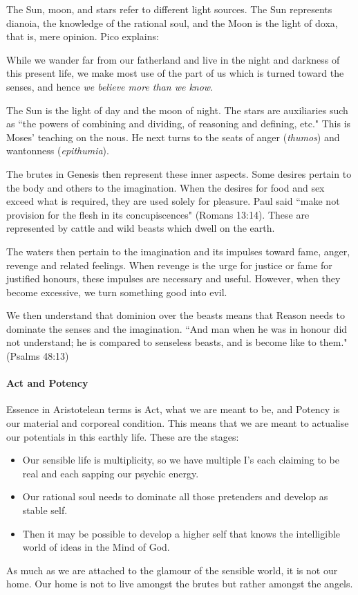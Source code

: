The Sun, moon, and stars refer to different light sources. The Sun represents dianoia, the knowledge of the rational soul, and the Moon is the light of doxa, that is, mere opinion. Pico explains:

\begin{quotex}
While we wander far from our fatherland and live in the night and darkness of this present life, we make most use of the part of us which is turned toward the senses, and hence \emph{we believe more than we know}. 

\end{quotex}
The Sun is the light of day and the moon of night. The stars are auxiliaries such as ``the powers of combining and dividing, of reasoning and defining, etc." This is Moses' teaching on the nous. He next turns to the seats of anger (\emph{thumos}) and wantonness (\emph{epithumia}).

The brutes in Genesis then represent these inner aspects. Some desires pertain to the body and others to the imagination. When the desires for food and sex exceed what is required, they are used solely for pleasure. Paul said ``make not provision for the flesh in its concupiscences" (Romans 13:14). These are represented by cattle and wild beasts which dwell on the earth.

The waters then pertain to the imagination and its impulses toward fame, anger, revenge and related feelings. When revenge is the urge for justice or fame for justified honours, these impulses are necessary and useful. However, when they become excessive, we turn something good into evil.

We then understand that dominion over the beasts means that Reason needs to dominate the senses and the imagination. ``And man when he was in honour did not understand; he is compared to senseless beasts, and is become like to them." (Psalms 48:13)

\paragraph{Act and Potency}
Essence in Aristotelean terms is Act, what we are meant to be, and Potency is our material and corporeal condition. This means that we are meant to actualise our potentials in this earthly life. These are the stages:

\begin{itemize}
\item Our sensible life is multiplicity, so we have multiple I's each claiming to be real and each sapping our psychic energy. 
\item Our rational soul needs to dominate all those pretenders and develop as stable self. 
\item Then it may be possible to develop a higher self that knows the intelligible world of ideas in the Mind of God. 
\end{itemize}
As much as we are attached to the glamour of the sensible world, it is not our home. Our home is not to live amongst the brutes but rather amongst the angels.

